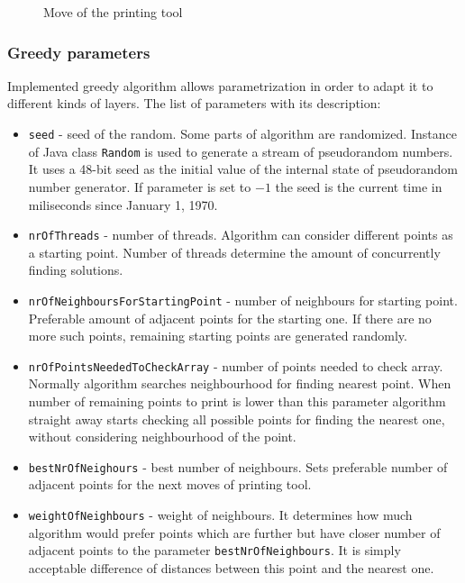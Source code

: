 \documentclass[titlepage]{article}
\newcommand{\multifigcaption}{\captionsetup{justification=justified}}
\begin{document}
\begin{figure}[H]
\begin{center}
\begin{minipage}{.45\linewidth}
 			\multifigcaption
 			\caption{Move of the printing tool \newline}
			\label{img:greedy/example-neighbours-neigh-solv} 
		\end{minipage}
	\end{center}
\end{figure}

\subsubsection{Greedy parameters}

Implemented greedy algorithm allows parametrization in order to adapt it to different kinds of layers. The list of parameters with its description:

\begin{itemize}
	\item \texttt{seed} - seed of the random. Some parts of algorithm are randomized. Instance of Java class \texttt{Random} is used to generate a stream of pseudorandom numbers. It uses a 48-bit seed as the initial value of the internal state of pseudorandom number generator. If parameter is set to $-1$ the seed is the current time in miliseconds since January 1, 1970.
	
	\item \texttt{nrOfThreads} - number of threads. Algorithm can consider different points as a starting point. Number of threads determine the amount of concurrently finding solutions.
	
	\item \texttt{nrOfNeighboursForStartingPoint} - number of neighbours for starting point. Preferable amount of adjacent points for the starting one. If there are no more such points, remaining starting points are generated randomly.
	
	\item \texttt{nrOfPointsNeededToCheckArray} - number of points needed to check array. Normally algorithm searches neighbourhood for finding nearest point. When number of remaining points to print is lower than this parameter algorithm straight away starts checking all possible points for finding the nearest one, without considering neighbourhood of the point.
	
	\item \texttt{bestNrOfNeighours} - best number of neighbours. Sets preferable number of adjacent points for the next moves of printing tool.
	
	\item \texttt{weightOfNeighbours} - weight of neighbours. It determines how much algorithm would prefer points which are further but have closer number of adjacent points to the parameter \texttt{bestNrOfNeighbours}. It is simply acceptable difference of distances between this point and the nearest one.
	

\end{itemize}
\end{document}
